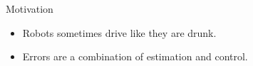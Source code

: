 \documentclass[hyperref={pdfpagelabels=false}]{beamer}
\begin{document}
\begin{frame}{Motivation}
\begin{itemize}
\item Robots sometimes drive like they are drunk.
\item Errors are a combination of estimation and control.
\end{itemize}
\begin{figure}
    \centering
    \mbox{
    } %
\end{figure}
\begin{figure}
    \centering
    \mbox{
        \subfigure{
}}
\end{figure}
\end{frame}
\end{document}
